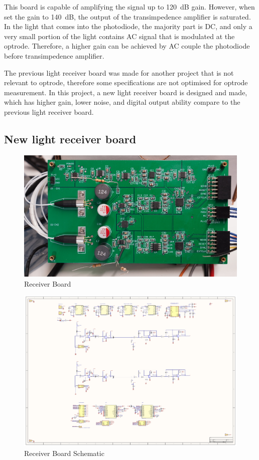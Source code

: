 This board is capable of amplifying the signal up to \qty{120}{dB} gain.  However, when set the gain to \qty{140}{dB}, the output of the transimpedence amplifier is saturated.  In the light that comes into the photodiode, the majority part is DC, and only a very small portion of the light contains AC signal that is modulated at the optrode.  Therefore, a higher gain can be achieved by AC couple the photodiode before transimpedence amplifier.

The previous light receiver board was made for another project that is not relevant to optrode, therefore some specifications are not optimised for optrode measurement.  In this project, a new light receiver board is designed and made, which has higher gain, lower noise, and digital output ability compare to the previous light receiver board.

\subsection{New light receiver board}

\begin{figure}[h]
\centering
\includegraphics[width=0.9\linewidth]{4-ANC_Sys/ReceiverBoard.jpg}
\caption{Receiver Board}
\label{fig_ReceiverBoard}
\end{figure}

\begin{figure}[h]
\centering
\includegraphics[width=1\linewidth]{4-ANC_Sys/ReceiverAmplifierBoardSchematic_23_5_2023.pdf}
\caption{Receiver Board Schematic}
\label{fig_sch}
\end{figure}

